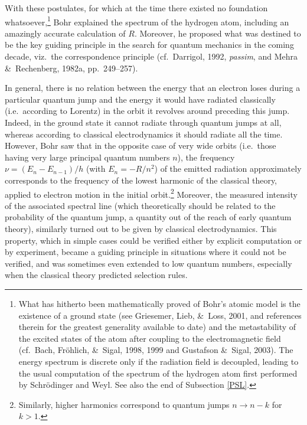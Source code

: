 \documentclass[12pt]{article}
\newcommand{\raw}{\rightarrow} \newcommand{\rat}{\mapsto}
\begin{document}
With these postulates, for which at the time there existed no foundation whatsoever,\footnote{\label{SigalF}What has hitherto been mathematically proved of Bohr's atomic model  is the existence of a ground state (see Griesemer,  Lieb, \&\ Loss, 2001, and references therein for the greatest generality available to date) and the metastability of the excited states of the atom after coupling to the electromagnetic field (cf.\ Bach, Fr\"{o}hlich, \&\  Sigal, 1998,  1999 and Gustafson \&\ Sigal, 2003). The energy spectrum is discrete only if the radiation field is decoupled, leading to the usual computation of the
spectrum of the hydrogen atom first performed by Schr\"{o}dinger and Weyl. See also the end of Subsection \ref{PSL}.}
 Bohr explained the spectrum of the hydrogen atom, including an amazingly accurate calculation of  $R$.
Moreover, he proposed what was destined to be the key guiding principle in the search for quantum mechanics in the coming decade, viz.\ the correspondence principle (cf.\ Darrigol, 1992, {\it passim},  and Mehra \&\ Rechenberg, 1982a, pp.\ 249--257). 

In general, there is no relation between the energy that an electron loses during a particular quantum jump and the energy it would have radiated classically (i.e.\ according to Lorentz) in the orbit it revolves around preceding this jump. Indeed, in the ground state it cannot radiate through quantum jumps  at all, whereas according to classical electrodynamics it should radiate  all the time. However, Bohr saw that in the opposite case of very wide orbits (i.e.\ those having very large principal quantum numbers $n$),
the frequency $\nu=(E_n-E_{n-1})/h$ (with $E_n=-R/n^2$) of the emitted radiation  approximately corresponds to the frequency of the lowest harmonic of the classical theory, applied to electron motion in the initial orbit.\footnote{Similarly,  higher harmonics correspond to quantum jumps
$n\raw n-k$ for $k>1$.} Moreover, the measured intensity of the associated spectral line (which theoretically should be related to the probability of the quantum jump, a quantity out of the  reach of early quantum theory), similarly turned out to be given by classical electrodynamics.
This property, which in simple cases could be verified either by explicit computation or by experiment, became a guiding principle in situations where it could not be verified, and was sometimes even extended to low quantum numbers, especially when the classical theory predicted selection rules. 
  
\end{document}
